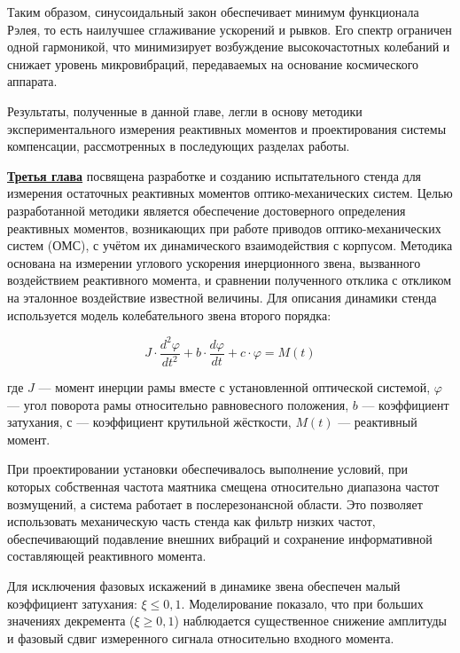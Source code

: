 Таким образом, синусоидальный закон обеспечивает минимум функционала Рэлея, то есть наилучшее сглаживание ускорений и рывков. Его спектр ограничен одной гармоникой, что минимизирует возбуждение высокочастотных колебаний и снижает уровень микровибраций, передаваемых на основание космического аппарата.

Результаты, полученные в данной главе, легли в основу методики экспериментального измерения реактивных моментов и проектирования системы компенсации, рассмотренных в последующих разделах работы.



\underline{\textbf{Третья глава}} посвящена разработке и созданию испытательного стенда для измерения остаточных реактивных моментов оптико-механических систем.
Целью разработанной методики является обеспечение достоверного определения реактивных моментов, возникающих при работе приводов оптико-механических систем (ОМС), с учётом их динамического взаимодействия с корпусом. Методика основана на измерении углового ускорения инерционного звена, вызванного воздействием реактивного момента, и сравнении полученного отклика с откликом на эталонное воздействие известной величины.
Для описания динамики стенда используется модель колебательного звена второго порядка:
\begin{samepage}
	\begin{equation*}
		\label{eq:stadeq}
		J\cdot \frac{d^2\varphi}{dt^2}+b \cdot \frac{d\varphi}{dt}+ c \cdot \varphi = M(t)
	\end{equation*}
	
	где \(J\) --- момент инерции рамы вместе с установленной оптической системой, \(\varphi\) --- угол поворота рамы относительно равновесного положения, \(b\) --- коэффициент затухания, \(с\) --- коэффициент крутильной жёсткости, \(M(t)\) --- реактивный момент.
	\end{samepage}


При проектировании установки обеспечивалось выполнение условий, при которых собственная частота маятника смещена относительно диапазона частот возмущений, а система работает в послерезонансной области. Это позволяет использовать механическую часть стенда как фильтр низких частот, обеспечивающий подавление внешних вибраций и сохранение информативной составляющей реактивного момента.

Для исключения фазовых искажений в динамике звена обеспечен малый коэффициент затухания: $\xi\leq 0,1$. Моделирование показало, что при больших значениях декремента ($\xi \geq 0,1 $) наблюдается существенное снижение амплитуды и фазовый сдвиг измеренного сигнала относительно входного момента.


